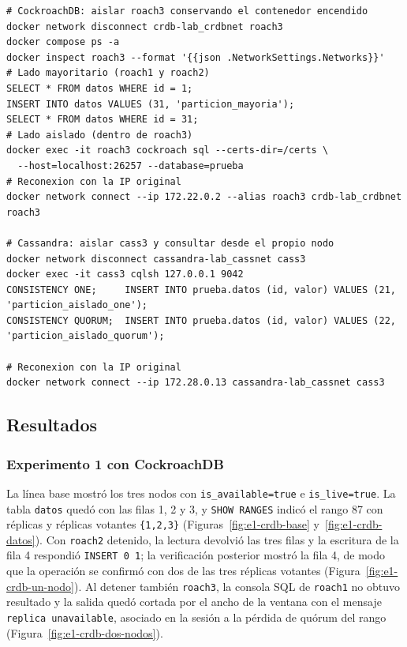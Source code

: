 \documentclass[11pt,a4paper]{article}
\newcommand{\sistemaA}{CockroachDB}      %
\begin{document}
\begin{lstlisting}[caption={Aislamiento y reconexión del nodo en cada sistema (extracto).},label={lst:e2-particion}]
# CockroachDB: aislar roach3 conservando el contenedor encendido
docker network disconnect crdb-lab_crdbnet roach3
docker compose ps -a
docker inspect roach3 --format '{{json .NetworkSettings.Networks}}'
# Lado mayoritario (roach1 y roach2)
SELECT * FROM datos WHERE id = 1;
INSERT INTO datos VALUES (31, 'particion_mayoria');
SELECT * FROM datos WHERE id = 31;
# Lado aislado (dentro de roach3)
docker exec -it roach3 cockroach sql --certs-dir=/certs \
  --host=localhost:26257 --database=prueba
# Reconexion con la IP original
docker network connect --ip 172.22.0.2 --alias roach3 crdb-lab_crdbnet roach3

# Cassandra: aislar cass3 y consultar desde el propio nodo
docker network disconnect cassandra-lab_cassnet cass3
docker exec -it cass3 cqlsh 127.0.0.1 9042
CONSISTENCY ONE;     INSERT INTO prueba.datos (id, valor) VALUES (21, 'particion_aislado_one');
CONSISTENCY QUORUM;  INSERT INTO prueba.datos (id, valor) VALUES (22, 'particion_aislado_quorum');

# Reconexion con la IP original
docker network connect --ip 172.28.0.13 cassandra-lab_cassnet cass3
\end{lstlisting}

\subsection{Resultados}

\subsubsection{Experimento 1 con \sistemaA{}}

La línea base mostró los tres nodos con \texttt{is\_available=true} e
\texttt{is\_live=true}. La tabla \texttt{datos} quedó con las filas 1, 2 y 3, y
\texttt{SHOW RANGES} indicó el rango 87 con réplicas y réplicas votantes
\texttt{\{1,2,3\}} (Figuras~\ref{fig:e1-crdb-base} y~\ref{fig:e1-crdb-datos}). Con \texttt{roach2} detenido,
la lectura devolvió las tres filas y la escritura de la fila 4 respondió
\texttt{INSERT 0 1}; la verificación posterior mostró la fila 4, de modo que la
operación se confirmó con dos de las tres réplicas votantes
(Figura~\ref{fig:e1-crdb-un-nodo}). Al detener también \texttt{roach3}, la consola
SQL de \texttt{roach1} no obtuvo resultado y la salida quedó cortada por el ancho de
la ventana con el mensaje \texttt{replica unavailable}, asociado en la sesión a la
pérdida de quórum del rango (Figura~\ref{fig:e1-crdb-dos-nodos}).
\end{document}
